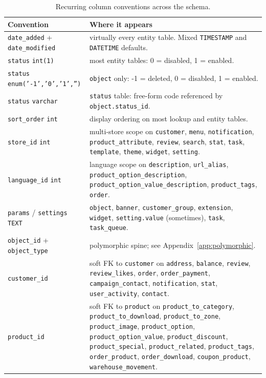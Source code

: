 \documentclass[11pt,a4paper]{article}
\begin{document}
\begin{table}[htbp]
\centering
\caption{Recurring column conventions across the schema.}\label{tab:conventions}
\footnotesize\sloppy
\begin{tabularx}{\columnwidth}{>{\raggedright\arraybackslash}p{4.2cm}X}
\toprule
\textbf{Convention} & \textbf{Where it appears} \\
\midrule
\texttt{date\_added} + \texttt{date\_modified} & virtually every entity table. Mixed \texttt{TIMESTAMP} and \texttt{DATETIME} defaults. \\
\texttt{status} \texttt{int(1)}                & most entity tables: 0 = disabled, 1 = enabled. \\
\texttt{status} \texttt{enum('-1','0','1','')} & \texttt{object} only: -1 = deleted, 0 = disabled, 1 = enabled. \\
\texttt{status} \texttt{varchar}                & \texttt{status} table: free-form code referenced by \texttt{object.status\_id}. \\
\texttt{sort\_order} \texttt{int}               & display ordering on most lookup and entity tables. \\
\texttt{store\_id} \texttt{int}                 & multi-store scope on \texttt{customer}, \texttt{menu}, \texttt{notification}, \texttt{product\_attribute}, \texttt{review}, \texttt{search}, \texttt{stat}, \texttt{task}, \texttt{template}, \texttt{theme}, \texttt{widget}, \texttt{setting}. \\
\texttt{language\_id} \texttt{int}              & language scope on \texttt{description}, \texttt{url\_alias}, \texttt{product\_option\_description}, \texttt{product\_option\_value\_description}, \texttt{product\_tags}, \texttt{order}. \\
\texttt{params} / \texttt{settings} \texttt{TEXT} & \texttt{object}, \texttt{banner}, \texttt{customer\_group}, \texttt{extension}, \texttt{widget}, \texttt{setting.value} (sometimes), \texttt{task}, \texttt{task\_queue}. \\
\texttt{object\_id} + \texttt{object\_type}     & polymorphic spine; see Appendix~\ref{app:polymorphic}. \\
\texttt{customer\_id}                           & soft FK to \texttt{customer} on \texttt{address}, \texttt{balance}, \texttt{review}, \texttt{review\_likes}, \texttt{order}, \texttt{order\_payment}, \texttt{campaign\_contact}, \texttt{notification}, \texttt{stat}, \texttt{user\_activity}, \texttt{contact}. \\
\texttt{product\_id}                            & soft FK to \texttt{product} on \texttt{product\_to\_category}, \texttt{product\_to\_download}, \texttt{product\_to\_zone}, \texttt{product\_image}, \texttt{product\_option}, \texttt{product\_option\_value}, \texttt{product\_discount}, \texttt{product\_special}, \texttt{product\_related}, \texttt{product\_tags}, \texttt{order\_product}, \texttt{order\_download}, \texttt{coupon\_product}, \texttt{warehouse\_movement}. \\

\end{tabularx}
\end{table}
\end{document}
